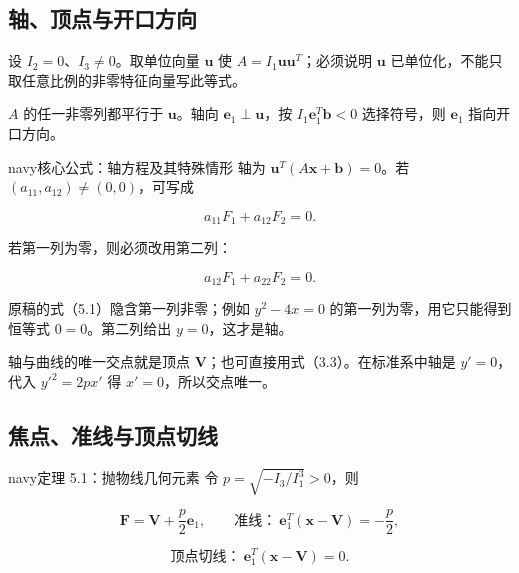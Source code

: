 \documentclass[11pt,a4paper]{article}
\begin{document}
\subsection{轴、顶点与开口方向}\label{ux8f74ux9876ux70b9ux4e0eux5f00ux53e3ux65b9ux5411}

设 \(I_2=0\)、\(I_3\ne0\)。取单位向量 \(\boldsymbol u\) 使
\(A=I_1\boldsymbol u\boldsymbol u^T\)；必须说明 \(\boldsymbol u\)
已单位化，不能只取任意比例的非零特征向量写此等式。

\(A\) 的任一非零列都平行于 \(\boldsymbol u\)。轴向
\(\boldsymbol e_1\perp\boldsymbol u\)，按
\(I_1\boldsymbol e_1^T\boldsymbol b<0\) 选择符号，则 \(\boldsymbol e_1\)
指向开口方向。

\begin{sboxenv}{navy}{核心公式：轴方程及其特殊情形}
轴为 \(\boldsymbol u^T(A\boldsymbol x+\boldsymbol b)=0\)。若
\((a_{11},a_{12})\ne(0,0)\)，可写成

\begin{equation*}
a_{11}F_1+a_{12}F_2=0.\tag{5.1}
\end{equation*}

若第一列为零，则必须改用第二列：

\begin{equation*}
a_{12}F_1+a_{22}F_2=0.\tag{5.2}
\end{equation*}

\end{sboxenv}

原稿的式（5.1）隐含第一列非零；例如 \(y^2-4x=0\)
的第一列为零，用它只能得到恒等式 \(0=0\)。第二列给出 \(y=0\)，这才是轴。

轴与曲线的唯一交点就是顶点
\(\boldsymbol V\)；也可直接用式（3.3）。在标准系中轴是 \(y'=0\)，代入
\(y'^2=2px'\) 得 \(x'=0\)，所以交点唯一。

\subsection{焦点、准线与顶点切线}\label{ux7126ux70b9ux51c6ux7ebfux4e0eux9876ux70b9ux5207ux7ebf}

\begin{sboxenv}{navy}{定理 5.1：抛物线几何元素}
令 \(p=\sqrt{-I_3/I_1^3}>0\)，则

\begin{equation*}
\boldsymbol F=\boldsymbol V+\frac p2\boldsymbol e_1,\qquad \text{准线：}\ \boldsymbol e_1^T(\boldsymbol x-\boldsymbol V)=-\frac p2,
\end{equation*}

\begin{equation*}
\text{顶点切线：}\ \boldsymbol e_1^T(\boldsymbol x-\boldsymbol V)=0.\tag{5.3}
\end{equation*}

\end{sboxenv}
\end{document}
